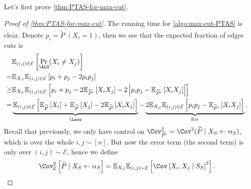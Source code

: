 Let's first prove \autoref{thm:PTAS-for-max-cut}.

\begin{proof}[Proof of \autoref{thm:PTAS-for-max-cut}]
	The running time for \autoref{algo:max-cut-PTAS} is clear. Denote \(p_i = \widetilde{P} ^\prime (X_i = 1)\), then we see that the expected fraction of edges cuts is
	\[
		\begin{split}
			     & \mathbb{E}_{(i, j)\in \mathcal{E} }\left[ \Pr_{\ALG}(X_i \neq X_j) \right]                                                                                                                                                                                                                                                                                                                      \\
			=    & \mathbb{E}_{X_S}\mathbb{E}_{(i, j)\in \mathcal{E} }\left[p_i + p_j - 2 p_i p_j \right]                                                                                                                                                                                                                                                                                                          \\
			\geq & \mathbb{E}_{X_S}\mathbb{E}_{(i, j)\in \mathcal{E} }\left[ p_i + p_j - 2 \mathbb{E}_{\widetilde{P} ^\prime }\left[X_i X_j \right] - 2 \left\vert p_i p_j - \mathbb{E}_{\widetilde{P} ^\prime }\left[X_i X_j \right]  \right\vert  \right]                                                                                                                                                        \\
			=    & \underbrace{\mathbb{E}_{(i, j)\in \mathcal{E} }\left[ \mathbb{E}_{\widetilde{P} }\left[X_i \right] + \mathbb{E}_{\widetilde{P} }\left[X_j \right] - 2 \mathbb{E}_{\widetilde{P} }\left[ X_i X_j\right]  \right]}_{\Lass} - \underbrace{2 \mathbb{E}_{X_S} \mathbb{E}_{(i, j)\in \mathcal{E} }\left[ p_i p_j - \mathbb{E}_{\widetilde{P} ^\prime }\left[ X_i X_j\right] \right]}_{\mathrm{Err}}.
		\end{split}
	\]
	Recall that previously, we only have control on \(\Cov_{\widetilde{P} ^\prime }^{2} = \Cov^2(\widetilde{P} \mid X_S\gets \alpha _S)\), which is over the whole \(i, j\sim[n]\). But now the error term (the second term) is only over \((i, j)\sim \mathcal{E} \), hence we define
	\[
		\Cov_{\mathcal{E} }^2\left[ \widetilde{P} \mid X_S \gets \alpha _S\right]
		= \mathbb{E}_{X_S} \mathbb{E}_{(i, j)\sim \mathcal{E} }\left[ \Cov_{}\left[X_i , X_j \mid S_S \right]^{2}\right].
\]
\end{proof}
